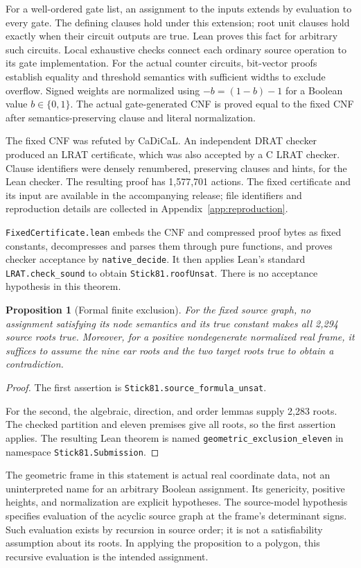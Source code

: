\documentclass[11pt]{article}
\newtheorem{proposition}[theorem]{Proposition}
\newcommand{\code}[1]{\nolinkurl{#1}}
\begin{document}
For a well-ordered gate list, an assignment to the inputs extends by
evaluation to every gate. The defining clauses hold under this
extension; root unit clauses hold exactly when their circuit outputs
are true. Lean proves this fact for arbitrary such circuits. Local
exhaustive checks connect each ordinary source operation to its gate
implementation. For the actual counter circuits, bit-vector proofs
establish equality and threshold semantics with sufficient widths to
exclude overflow. Signed weights are normalized using
$-b=(1-b)-1$ for a Boolean value $b\in\{0,1\}$.
The actual gate-generated CNF is proved equal to the fixed CNF after
semantics-preserving clause and literal normalization.

The fixed CNF was refuted by CaDiCaL. An independent DRAT checker
produced an LRAT certificate, which was also accepted by a C LRAT
checker. Clause identifiers were densely renumbered, preserving
clauses and hints, for the Lean checker. The resulting proof has
1,577,701 actions. The fixed certificate and its input are available in
the accompanying release; file identifiers and reproduction details
are collected in Appendix~\ref{app:reproduction}.

\code{FixedCertificate.lean} embeds the CNF and compressed proof bytes
as fixed constants, decompresses and parses them through pure functions,
and proves checker acceptance by \code{native_decide}. It then applies
Lean's standard \code{LRAT.check_sound} to obtain
\code{Stick81.roofUnsat}. There is no acceptance hypothesis in this
theorem.

\begin{proposition}[Formal finite exclusion]\label{prop:formal}
For the fixed source graph, no assignment satisfying its node semantics
and its true constant makes all 2,294 source roots true. Moreover,
for a positive nondegenerate normalized real frame, it suffices to
assume the nine ear roots and the two target roots true to obtain a
contradiction.
\end{proposition}
\begin{proof}
The first assertion is \code{Stick81.source_formula_unsat}.\par
For the second, the algebraic, direction, and order lemmas supply 2,283
roots. The checked partition and eleven premises give all roots, so the
first assertion applies. The resulting Lean theorem is named
\code{geometric_exclusion_eleven} in namespace \code{Stick81.Submission}.
\end{proof}

The geometric frame in this statement is actual real coordinate data,
not an uninterpreted name for an arbitrary Boolean assignment.
Its genericity, positive heights, and normalization are explicit
hypotheses. The source-model hypothesis specifies evaluation of the
acyclic source graph at the frame's determinant signs. Such evaluation
exists by recursion in source order; it is not a satisfiability
assumption about its roots. In applying the proposition to a polygon,
this recursive evaluation is the intended assignment.
\end{document}
